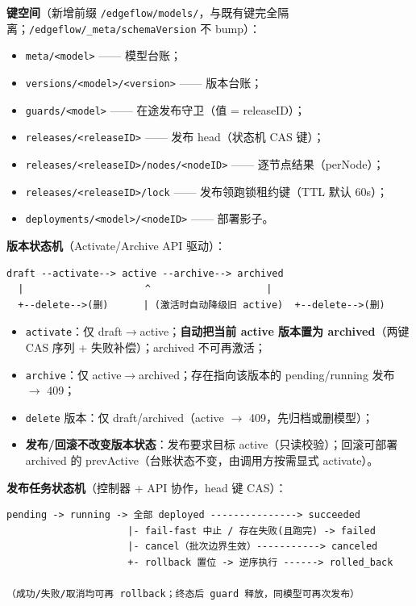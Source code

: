 \textbf{键空间}（新增前缀 \texttt{/edgeflow/models/}，与既有键完全隔离；\texttt{/edgeflow/\_meta/schemaVersion} 不 bump）：

\begin{itemize}
  \item \texttt{meta/<model>} —— 模型台账；
  \item \texttt{versions/<model>/<version>} —— 版本台账；
  \item \texttt{guards/<model>} —— 在途发布守卫（值 = releaseID）；
  \item \texttt{releases/<releaseID>} —— 发布 head（状态机 CAS 键）；
  \item \texttt{releases/<releaseID>/nodes/<nodeID>} —— 逐节点结果（perNode）；
  \item \texttt{releases/<releaseID>/lock} —— 发布领跑锁租约键（TTL 默认 60s）；
  \item \texttt{deployments/<model>/<nodeID>} —— 部署影子。
\end{itemize}

\textbf{版本状态机}（Activate/Archive API 驱动）：

\begin{lstlisting}
draft --activate--> active --archive--> archived
  |                     ^                    |
  +--delete-->(删)      | (激活时自动降级旧 active)  +--delete-->(删)
\end{lstlisting}

\begin{itemize}
  \item \texttt{activate}：仅 draft$\rightarrow$active；\textbf{自动把当前 active 版本置为 archived}（两键 CAS 序列 + 失败补偿）；archived 不可再激活；
  \item \texttt{archive}：仅 active$\rightarrow$archived；存在指向该版本的 pending/running 发布 $\rightarrow$ 409；
  \item \texttt{delete} 版本：仅 draft/archived（active $\rightarrow$ 409，先归档或删模型）；
  \item \textbf{发布/回滚不改变版本状态}：发布要求目标 active（只读校验）；回滚可部署 archived 的 prevActive（台账状态不变，由调用方按需显式 activate）。
\end{itemize}

\textbf{发布任务状态机}（控制器 + API 协作，head 键 CAS）：

\begin{lstlisting}
pending -> running -> 全部 deployed ---------------> succeeded
                     |- fail-fast 中止 / 存在失败(且跑完) -> failed
                     |- cancel（批次边界生效）-----------> canceled
                     +- rollback 置位 -> 逆序执行 ------> rolled_back

（成功/失败/取消均可再 rollback；终态后 guard 释放，同模型可再次发布）
\end{lstlisting}

